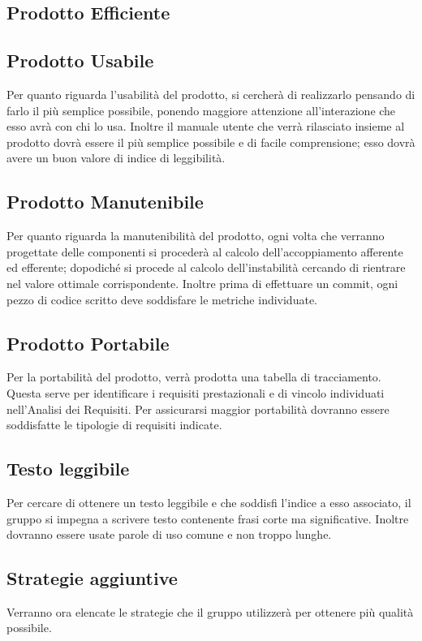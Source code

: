 \subsection{Prodotto Efficiente}

\subsection{Prodotto Usabile}
Per quanto riguarda l'usabilità del prodotto, si cercherà di realizzarlo pensando di farlo il più semplice possibile, ponendo maggiore attenzione all'interazione che esso avrà con chi lo usa. Inoltre il manuale utente che verrà rilasciato insieme al prodotto dovrà essere il più semplice possibile e di facile comprensione; esso dovrà avere un buon valore di indice di leggibilità.

\subsection{Prodotto Manutenibile}
Per quanto riguarda la manutenibilità del prodotto, ogni volta che verranno progettate delle componenti si procederà al calcolo dell'accoppiamento afferente ed efferente; dopodiché si procede al calcolo dell'instabilità cercando di rientrare nel valore ottimale corrispondente. Inoltre prima di effettuare un commit, ogni pezzo di codice scritto deve soddisfare le metriche individuate.

\subsection{Prodotto Portabile}
Per la portabilità del prodotto, verrà prodotta una tabella di tracciamento. Questa serve per identificare i requisiti prestazionali e di vincolo individuati nell'Analisi dei Requisiti. Per assicurarsi maggior portabilità dovranno essere soddisfatte le tipologie di requisiti indicate.

\subsection{Testo leggibile}
Per cercare di ottenere un testo leggibile e che soddisfi l'indice a esso associato, il gruppo si impegna a scrivere testo contenente frasi corte ma significative. Inoltre dovranno essere usate parole di uso comune e non troppo lunghe.

\subsection{Strategie aggiuntive}
Verranno ora elencate le strategie che il gruppo utilizzerà per ottenere più qualità possibile.

